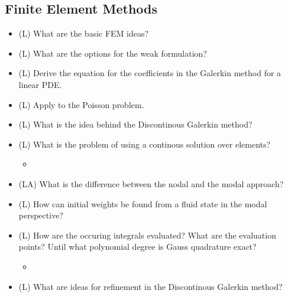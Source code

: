 \subsection*{Finite Element Methods}

\begin{itemize}
    \item (L) What are the basic FEM ideas?
    \item (L) What are the options for the weak formulation?
    \item (L) Derive the equation for the coefficients in the Galerkin method for a linear PDE.
    \item (L) Apply to the Poisson problem.
    \item (L) What is the idea behind the Discontinous Galerkin method?
    \item (L) What is the problem of using a continous solution over elements?
    \begin{itemize}
        \item {}
    \end{itemize}
    \item (LA) What is the difference between the nodal and the modal approach?
    \item (L) How can initial weights be found from a fluid state in the modal perspective?
    \item (L) How are the occuring integrals evaluated? What are the evaluation points? Until what polynomial
    degree is Gauss quadrature exact?
    \begin{itemize}
        \item {}
    \end{itemize}
    \item (L) What are ideas for refinement in the Discontinous Galerkin method?
\end{itemize}

